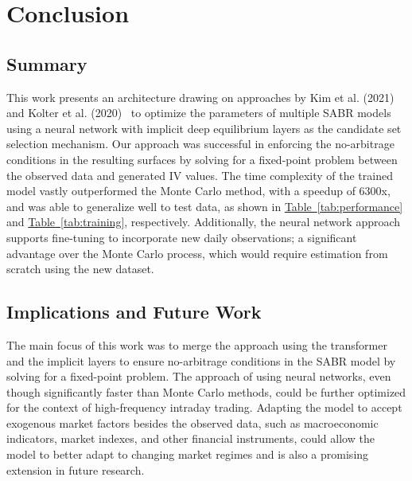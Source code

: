 \section{Conclusion}
\label{sec:conclusion}

\subsection{Summary}
\label{subsec:summary}
This work presents an architecture drawing on approaches by Kim et al. (2021)~\cite{Kim2021} and Kolter et al. (2020)~\cite{Kolter2020}
to optimize the parameters of multiple SABR models using a neural network with implicit deep equilibrium layers as the candidate set selection mechanism.
Our approach was successful in enforcing the no-arbitrage conditions in the resulting surfaces by solving for a fixed-point problem between the observed data and generated IV values.
The time complexity of the trained model vastly outperformed the Monte Carlo method, with a speedup of 6300x, and was able to generalize well to test data,
as shown in \hyperref[tab:performance]{Table~\ref*{tab:performance}} and \hyperref[tab:training]{Table~\ref*{tab:training}}, respectively.
Additionally, the neural network approach supports fine-tuning to incorporate new daily observations;
a significant advantage over the Monte Carlo process, which would require estimation from scratch using the new dataset.

\subsection{Implications and Future Work}
\label{subsec:implications}
The main focus of this work was to merge the approach using the transformer and the implicit layers to
ensure no-arbitrage conditions in the SABR model by solving for a fixed-point problem.
The approach of using neural networks, even though significantly faster than Monte Carlo methods, could be further optimized for the context of high-frequency intraday trading.
Adapting the model to accept exogenous market factors besides the observed data, such as macroeconomic indicators, market indexes, and other financial instruments,
could allow the model to better adapt to changing market regimes and is also a promising extension in future research.
